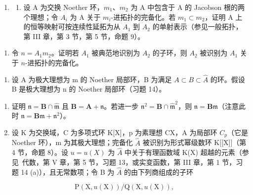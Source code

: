 \begin{enumerate}
\def\labelenumi{\arabic{enumi}.}
\setcounter{enumi}{11}
\tightlist
\item
  \begin{enumerate}
  \def\labelenumii{(\alph{enumii})}
  \tightlist
  \item
    设 A 为交换 Noether 环，\(m_{1}\)、\(m_{2}\) 为 A 中包含于 A 的 Jacobson 根的两个理想；令 \(A_{i}\) 为 A 关于 \(m_{i}\)-进拓扑的完备化。若 \(m_{1} \subset m_{2}\)，证明 A 上的恒等映射可按连续性延拓为从 \(A_{1}\) 到 \(A_{2}\) 的单射表示（参见一般拓扑，第 III 章，第 3 节，第 5 节，命题 9）。~
  \end{enumerate}
\end{enumerate}

\begin{enumerate}
\def\labelenumi{(\alph{enumi})}
\setcounter{enumi}{1}
\tightlist
\item
  令 \(n = A_1 m_2\)。证明若 \(A_1\) 被典范地识别为 \(A_2\) 的子环，则 \(A_2\) 被识别为 \(A_1\) 关于 \(n\)-进拓扑的完备化。
\end{enumerate}

\begin{enumerate}
\def\labelenumi{\arabic{enumi}.}
\setcounter{enumi}{12}
\tightlist
\item
  设 A 为极大理想为 m 的 Noether 局部环，B 为满足 \(A \subset B \subset \hat{A}\) 的环。假设 B 是极大理想为 n 的 Noether 局部环（习题 14）。
\end{enumerate}

\begin{enumerate}
\def\labelenumi{(\alph{enumi})}
\item
  证明 \(\mathfrak{n} = \mathbf{B} \cap \hat{\mathfrak{m}}\) 且 \(\mathbf{B} = \mathbf{A} + \mathfrak{n}\)。若进一步 \(\mathfrak{n}^2 = \mathbf{B} \cap \hat{\mathfrak{m}}^2\)，则 \(\mathfrak{n} = \mathbf{B}\mathfrak{m}\)（注意此时 \(\mathfrak{n} = \mathbf{B}\mathfrak{m} + \mathfrak{n}^2\)）。
\item
  设 K 为交换域，C 为多项式环 K{[}X{]}，p 为素理想 CX，A 为局部环 \(C_{p}\)（它是 Noether 环），m 为其极大理想；完备化 \(\hat{A}\) 被识别为形式幂级数环 K{[}{[}X{]}{]}（第 4 节，命题 8）。设 \(u = u(X)\) 为 \(\hat{A}\) 中关于有理函数域 K(X) 超越的元素（参见~代数，第 V 章，第 5 节，习题 13，或实变函数，第 III 章，第 1 节，习题 14 (a)），且无常数项；令 B 为 \(\hat{A}\) 的由下列商组成的子环
\end{enumerate}

\[
\mathrm{P} (\mathrm{X}, u (\mathrm{X})) / \mathrm{Q} (\mathrm{X}, u (\mathrm{X})),
\]

